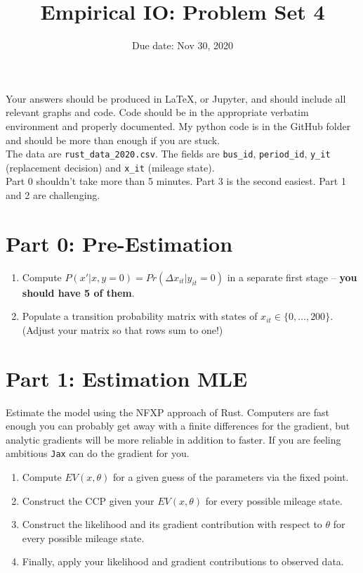 \documentclass{article}
\title{Empirical IO: Problem Set 4}
\begin{document}
\small
\date{Due date: Nov 30, 2020}
\maketitle
Your answers should be produced in \LaTeX, or Jupyter, and should include all relevant graphs and code.  Code should be in the appropriate verbatim environment and properly documented. My python code is in the GitHub folder and should be more than enough if you are stuck.\\

The data are \texttt{rust\_data\_2020.csv}. The fields are \texttt{bus\_id}, \texttt{period\_id},  \texttt{y\_it} (replacement decision) and  \texttt{x\_it} (mileage state).\\

Part 0 shouldn't take more than 5 minutes. Part 3 is the second easiest. Part 1 and 2 are challenging.

\section*{Part 0: Pre-Estimation}
\begin{enumerate}
\item Compute $P(x' | x,y=0) = Pr(\Delta x_{it} | y_{it} = 0)$ in a separate first stage -- \textbf{you should have 5 of them}.
\item Populate a transition probability matrix with states of $x_{it} \in \{0,\ldots,200\}$.\\
 (Adjust your matrix so that rows sum to one!)
\end{enumerate}

\section*{Part 1: Estimation MLE}
Estimate the model using the NFXP approach of Rust. Computers are fast enough you can probably get away with a finite differences for the gradient, but analytic gradients will be more reliable in addition to faster. If you are feeling ambitious \texttt{Jax} can do the gradient for you.
\begin{enumerate}
\item Compute $EV(x, \theta)$ for a given guess of the parameters via the fixed point.
\item Construct the CCP given your $EV(x, \theta)$ for every possible mileage state.
\item Construct the likelihood and its gradient contribution with respect to $\theta$ for every possible mileage state.
\item Finally, apply your likelihood and gradient contributions to observed data.
\end{enumerate}
\end{document}
